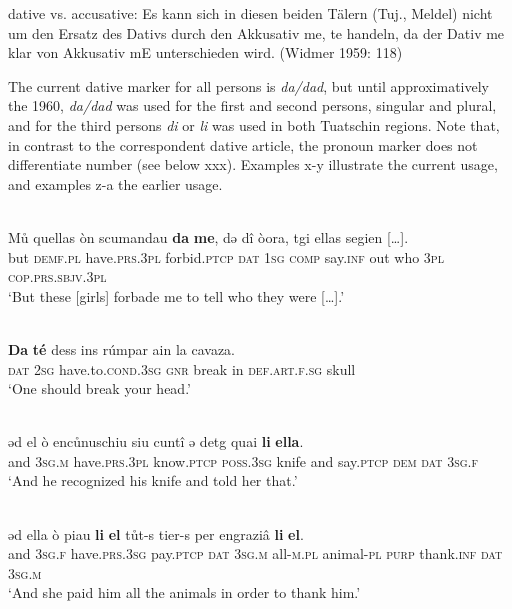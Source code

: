 {dative vs. accusative: Es kann sich in diesen beiden Tälern (Tuj., Meldel) nicht um den Ersatz des Dativs durch den Akkusativ me, te handeln, da der Dativ me klar von Akkusativ mE unterschieden wird. (Widmer 1959: 118)

The current dative marker for all persons is \textit{da/dad}, but until approximatively the 1960, \textit{da/dad} was used for the first and second persons, singular and plural, and for the third persons \textit{di} or \textit{li} was used in both Tuatschin regions. Note that, in contrast to the correspondent dative article, the pronoun marker does not differentiate number (see below xxx). Examples x-y illustrate the current usage, and examples z-a the earlier usage.

\ea\label{}
\\
\gll    Mů quellas òn scumandau \textbf{da} \textbf{me}, dǝ dî òora, tgi ellas segien […].\\
     but \textsc{demf.pl} have.\textsc{prs.3pl} forbid.\textsc{ptcp} \textsc{dat} \textsc{1sg} \textsc{comp} say.\textsc{inf} out who \textsc{3pl} \textsc{cop.prs.sbjv.3pl} \\
\glt `But these [girls] forbade me to tell who they were […].'
\z

\ea\label{}
\\
\gll   \textbf{Da} \textbf{té} dess ins rúmpar ain la cavaza.\\
     \textsc{dat} \textsc{2sg} have.to.\textsc{cond.3sg} \textsc{gnr} break in \textsc{def.art.f.sg} skull\\
\glt `One should break your head.'
\z


\ea\label{}
 {\citealt[14]{Büchli1966}}\\
\gll  ǝd el ò encůnuschiu siu cuntî ǝ detg quai \textbf{li} \textbf{ella}. \\
     and 3\textsc{sg}.\textsc{m}  have.\textsc{prs}.3\textsc{pl}  know.\textsc{ptcp}  \textsc{poss}.3\textsc{sg}  knife and say.\textsc{ptcp}  \textsc{dem}  \textsc{dat}  3\textsc{sg}.\textsc{f}\\
\glt `And he recognized his knife and told her that.'
\z

 
\ea\label{}
 {\citealt[14]{Büchli1966}}\\
\gll  ǝd ella ò piau \textbf{li} \textbf{el} tůt-s tier-s per engraziâ \textbf{li} \textbf{el}.\\
     and 3\textsc{sg}.\textsc{f} have.\textsc{prs}.3\textsc{sg} pay.\textsc{ptcp} \textsc{dat} 3\textsc{sg}.\textsc{m} all-\textsc{m}.\textsc{pl} animal-\textsc{pl} \textsc{purp} thank.\textsc{inf} \textsc{dat} 3\textsc{sg}.\textsc{m}\\
\glt `And she paid him all the animals in order to thank him.'
\z

}
